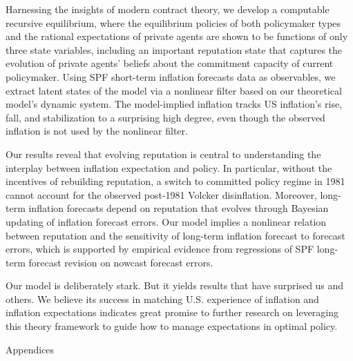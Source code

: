 \documentclass[12pt,letter,leqno]{article}
\theoremstyle{asn}
\theoremstyle{lem}
\theoremstyle{slem}
\theoremstyle{prop}
\theoremstyle{appprop}
\theoremstyle{rem}
\theoremstyle{defn}
\begin{document}
Harnessing the insights of modern contract theory, we develop a computable recursive equilibrium, where the equilibrium policies of both policymaker types and the rational expectations of private agents are shown to be functions of only three state variables, including an important reputation state that captures the evolution of private agents' beliefs about the commitment capacity of current policymaker. 
Using SPF short-term inflation forecasts data as observables, we extract latent states of the model via a nonlinear filter based on our theoretical model's dynamic system. The model-implied inflation tracks US inflation’s rise, fall, and stabilization to a surprising high degree, even though the observed inflation is not used by the nonlinear filter. 

Our results reveal that evolving reputation is central to understanding the interplay between inflation expectation and policy. In particular, without the incentives of rebuilding reputation, a switch to committed policy regime in 1981 cannot account for the observed post-1981 Volcker disinflation. Moreover, long-term inflation forecasts depend on reputation that evolves through Bayesian updating of inflation forecast errors. Our model implies a nonlinear relation between reputation and the sensitivity of long-term inflation forecast to forecast errors, which is supported by empirical evidence from regressions of SPF long-term forecast revision on nowcast forecast errors. 

Our model is deliberately stark. But it yields results that have surprised us and others. We believe its success in matching U.S. experience of inflation and inflation expectations indicates great promise to further research on leveraging this theory framework to guide how to manage expectations in optimal policy.




\newpage
\baselineskip13pt 

%
%





\linespread{1}

\newpage 
\appendix
\begin{center}
{\Large {Appendices} }
\setcounter{footnote}{0}
\setcounter{page}{1}
\end{center}
\end{document}
